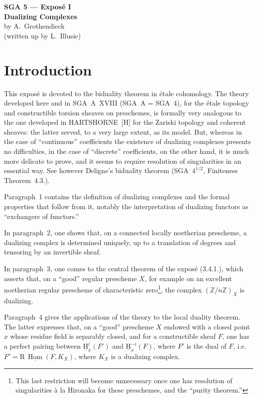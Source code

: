 \documentclass[11pt]{article}
\renewcommand{\H}{\mathrm{H}}
\DeclareMathOperator{\Hom}{Hom}
\newcommand{\R}{\mathrm{R}}
\newcommand{\Z}{\mathbb{Z}}
\begin{document}
\begin{center}
{\Large \textbf{SGA 5 --- Exposé I}}\\[0.4em]
{\large \textbf{Dualizing Complexes}}\\[0.3em]
by A.~Grothendieck\\
(written up by L.~Illusie)
\end{center}

\section*{Introduction}

This exposé is devoted to the biduality theorem in étale cohomology. The theory developed here and in SGA~A~XVIII (SGA~A = SGA~4), for the étale topology and constructible torsion sheaves on preschemes, is formally very analogous to the one developed in HARTSHORNE~[H] for the Zariski topology and coherent sheaves: the latter served, to a very large extent, as its model. But, whereas in the case of ``continuous'' coefficients the existence of dualizing complexes presents no difficulties, in the case of ``discrete'' coefficients, on the other hand, it is much more delicate to prove, and it seems to require resolution of singularities in an essential way. See however Deligne's biduality theorem (SGA~$4^{1/2}$, Finiteness Theorem~4.3.).

Paragraph~1 contains the definition of dualizing complexes and the formal properties that follow from it, notably the interpretation of dualizing functors as ``exchangers of functors.''

In paragraph~2, one shows that, on a connected locally noetherian prescheme, a dualizing complex is determined uniquely, up to a translation of degrees and tensoring by an invertible sheaf.

In paragraph~3, one comes to the central theorem of the exposé (3.4.1.), which asserts that, on a ``good'' regular prescheme $X$, for example on an excellent noetherian regular prescheme of characteristic zero\footnote{This last restriction will become unnecessary once one has resolution of singularities à la Hironaka for these preschemes, and the ``purity theorem.''}, the complex $(\Z/n\Z)_X$ is dualizing.

Paragraph~4 gives the applications of the theory to the local duality theorem. The latter expresses that, on a ``good'' prescheme $X$ endowed with a closed point $x$ whose residue field is separably closed, and for a constructible sheaf $F$, one has a perfect pairing between $\underline{\H}^i_x(F')$ and $\underline{\H}^{-i}_x(F)$, where $F'$ is the dual of $F$, i.e.\ $F' = \R\,\underline{\Hom}(F,K_X)$, where $K_X$ is a dualizing complex.
\end{document}
